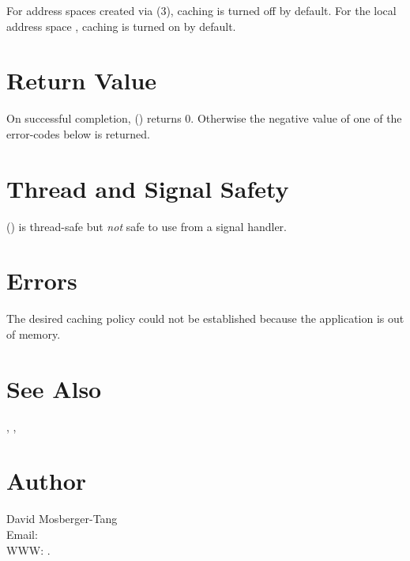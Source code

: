 \documentclass{article}
\begin{document}
For address spaces created via (3),
caching is turned off by default.  For the local address space
, caching is turned on by default.

\section{Return Value}

On successful completion, () returns 0.
Otherwise the negative value of one of the error-codes below is
returned.

\section{Thread and Signal Safety}

() is thread-safe but \emph{not} safe
to use from a signal handler.

\section{Errors}

\begin{Description}
\item[\Const{UNW\_ENOMEM}] The desired caching policy could not be
  established because the application is out of memory.
\end{Description}

\section{See Also}

,
,

\section{Author}

\noindent
David Mosberger-Tang\\
Email: \\
WWW: .
\LatexManEnd
\end{document}

